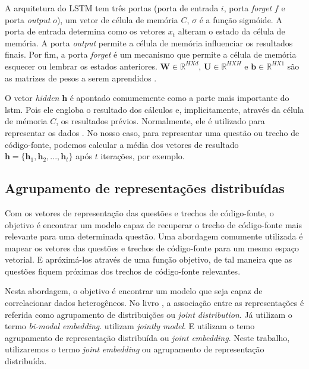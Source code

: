 A arquitetura do LSTM tem três portas (porta de entrada $i$, porta \textit{forget} $f$ e porta \textit{output} $o$), um vetor de célula de memória $C$, $\sigma$ é a função sigmóide. A porta de entrada determina como os vetores $x_{t}$ alteram o estado da célula de memória. A porta \textit{output} permite a célula de memória influenciar os resultados finais. Por fim, a porta \textit{forget} é um mecanismo que permite a célula de memória esquecer ou lembrar os estados anteriores. $\bm{W} \in \mathbb{R}^{H X d}$, $\bm{U} \in \mathbb{R}^{H X H}$ e $\bm{b} \in \mathbb{R}^{H X 1}$ são as matrizes de pesos a serem aprendidos \citep{tan-lstm-qa}.

O vetor \textit{hidden} $\bm{h}$ é apontado comumemente como a parte mais importante do \acrshort{lstm}. Pois ele engloba o resultado dos cálculos e, implicitamente, através da célula de mémoria $C$, os resultados prévios. Normalmente, ele é utilizado para representar os dados \citep{tom-young:trends-deep-learning-nlp}.
No nosso caso, para representar uma questão ou trecho de código-fonte, podemos calcular a média dos vetores de resultado $\bm{h} = \{ \bm{h}_{1}, \bm{h}_{2}, . . ., \bm{h}_t \}$ após $t$ iterações, por exemplo.

\subsection{Agrupamento de representações distribuídas}

Com os vetores de representação das questões e trechos de código-fonte, o objetivo é encontrar um modelo capaz de recuperar o trecho de código-fonte mais relevante para uma determinada questão. Uma abordagem comumente utilizada é mapear os vetores das questões e trechos de código-fonte para um mesmo espaço vetorial. E apróximá-los através de uma função objetivo, de tal maneira que as questões fiquem próximas dos trechos de código-fonte relevantes. 

Nesta abordagem, o objetivo é encontrar um modelo que seja capaz de correlacionar dados heterogêneos. No livro \cite{Goodfellow-et-al-2016:representation-learning}, a associação entre as representações é referida como agrupamento de distribuições ou \textit{joint distribution}. Já \cite{cambronero-deep-learning-code-search:2019, Allamanis-bimodal-source-code-natural-language:2015} utilizam o termo \textit{bi-modal embedding}. \cite{Zhang:2019:deep-learning-recommender-survey} utilizam \textit{jointly model}. E \cite{Gu-deep-code-search:2018} utilizam o temo agrupamento de representação distribuída ou \textit{joint embedding}. Neste trabalho, utilizaremos o termo \textit{joint embedding} ou agrupamento de representação distribuída.


